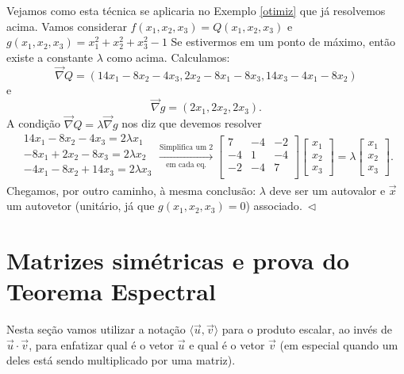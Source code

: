\documentclass[../livro.tex]{subfiles}
\begin{document}
\begin{remark}[Opcional]
	Vejamos como esta técnica se aplicaria no Exemplo \ref{otimiz} que já resolvemos acima. Vamos considerar $f(x_1,x_2,x_3) = Q(x_1,x_2,x_3)$ e $g(x_1,x_2,x_3) = x_1^2 + x_2^2 + x_3^2 - 1$ Se estivermos em um ponto de máximo, então existe a constante $\lambda$ como acima. Calculamos:
	\begin{equation}
	\vec{\nabla} Q = \left( 14x_1 - 8x_2 - 4 x_3, 2x_2 - 8 x_1 - 8 x_3, 14x_3 - 4 x_1 - 8 x_2 \right) 
	\end{equation} e 
	\begin{equation}
	\vec{\nabla} g = \left( 2 x_1, 2 x_2, 2 x_3 \right) .
	\end{equation} A condição $\vec{\nabla} Q = \lambda \vec{\nabla} g$ nos diz que devemos resolver
	\begin{equation}
	\begin{array}{c}
	14 x_1 - 8x_2 - 4 x_3 = 2 \lambda x_1 \\
	-8x_1 + 2x_2  - 8 x_3 = 2 \lambda x_2 \\
	- 4x_1 - 8 x_2 +14x_3 = 2 \lambda x_3 \\
	\end{array} \xrightarrow[\text{em cada eq.}]{\text{Simplifica um $2$}}
	\begin{bmatrix}
	7 & -4 & -2 \\
	-4 & 1 & -4 \\
	-2 & -4 & 7 \\
	\end{bmatrix} 
	\begin{bmatrix}
	x_1 \\ x_2 \\ x_3
	\end{bmatrix} = \lambda
	\begin{bmatrix}
	x_1 \\ x_2 \\ x_3
	\end{bmatrix}.
	\end{equation} Chegamos, por outro caminho, à mesma conclusão: $\lambda$ deve ser um autovalor e $\vec{x}$ um autovetor (unitário, já que $g(x_1,x_2,x_3) = 0$) associado$. \ \lhd$
\end{remark}


\section{Matrizes simétricas e prova do Teorema Espectral}

Nesta seção vamos utilizar a notação $\langle \vec{u}, \vec{v} \rangle$ para o produto escalar, ao invés de $\vec{u} \cdot \vec{v}$, para enfatizar qual é o vetor $\vec{u}$ e qual é o vetor $\vec{v}$ (em especial quando um deles está sendo multiplicado por uma matriz).
\end{document}
